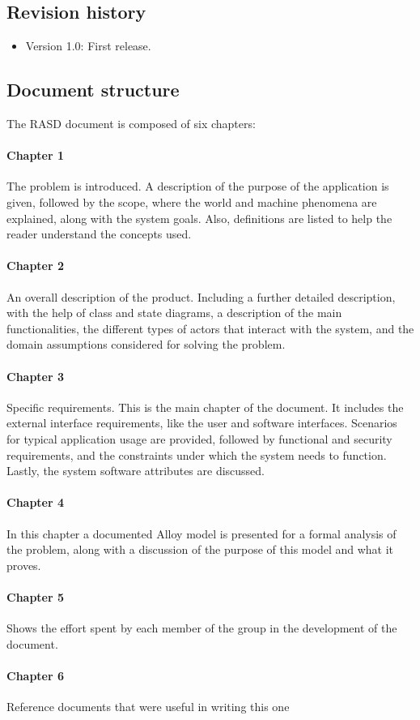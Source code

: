 \subsection{Revision history}
\begin{itemize}
    \item Version 1.0: First release.
\end{itemize}

\subsection{Document structure}
The RASD document is composed of six chapters:

\paragraph{Chapter 1} The problem is introduced. A description of the purpose of the application is given, followed by the scope, where the world and machine phenomena are explained, along with the system goals. Also, definitions are listed to help the reader understand the concepts used.

\paragraph{Chapter 2} An overall description of the product. Including a further detailed description, with the help of class and state diagrams, a description of the main functionalities, the different types of actors that interact with the system, and the domain assumptions considered for solving the problem.

\paragraph{Chapter 3} Specific requirements. This is the main chapter of the document. It includes the external interface requirements, like the user and software interfaces. Scenarios for typical application usage are provided, followed by functional and security requirements, and the constraints under which the system needs to function. Lastly, the system software attributes are discussed.

\paragraph{Chapter 4} In this chapter a documented Alloy model is presented for a formal analysis of the problem, along with a discussion of the purpose of this model and what it proves.

\paragraph{Chapter 5} Shows the effort spent by each member of the group in the development of the document.

\paragraph{Chapter 6} Reference documents that were useful in writing this one

